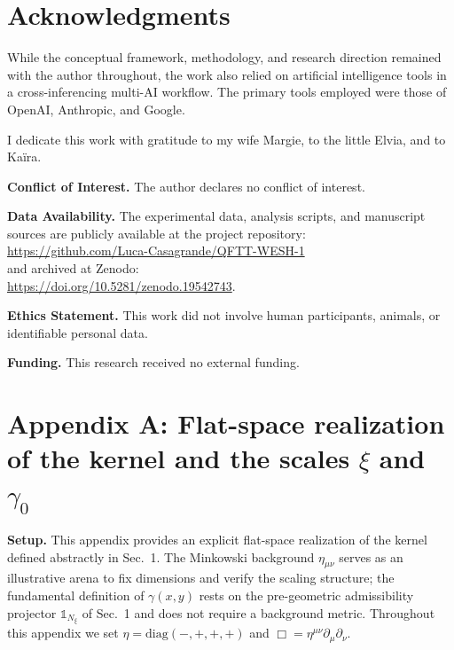 \documentclass[12pt,a4paper]{article}
\numberwithin{equation}{section}
\begin{document}
\section*{Acknowledgments}

\noindent While the conceptual framework, methodology, and research direction remained with the author throughout, the work also relied on artificial intelligence tools in a cross-inferencing multi-AI workflow. The primary tools employed were those of OpenAI, Anthropic, and Google. 

\vspace{0.3cm}
\noindent I dedicate this work with gratitude to my wife Margie, to the little Elvia, and to Ka\"ira.

\vspace{0.3cm}
\noindent\textbf{Conflict of Interest.} The author declares no conflict of interest.

\noindent\textbf{Data Availability.} The experimental data, analysis scripts, and manuscript sources are publicly available at the project repository:\\
\url{https://github.com/Luca-Casagrande/QFTT-WESH-1}\\
and archived at Zenodo:\\
\url{https://doi.org/10.5281/zenodo.19542743}.

\noindent\textbf{Ethics Statement.} This work did not involve human participants, animals, or identifiable personal data.

\noindent\textbf{Funding.} This research received no external funding.

\vspace{0.8cm}

\section*{Appendix A: Flat-space realization of the kernel and the scales \texorpdfstring{$\xi$}{ξ} and \texorpdfstring{$\gamma_0$}{γ0}}

\begingroup
\setcounter{equation}{0}
\renewcommand{\theequation}{A.\arabic{equation}}
\renewcommand{\theHequation}{A.\arabic{equation}}

\noindent\textbf{Setup.}
This appendix provides an explicit flat-space realization of the kernel defined abstractly in Sec.~1. The Minkowski background $\eta_{\mu\nu}$ serves as an illustrative arena to fix dimensions and verify the scaling structure; the fundamental definition of $\gamma(x,y)$ rests on the pre-geometric admissibility projector $\mathbb{1}_{N_\xi}$ of Sec.~1 and does not require a background metric. Throughout this appendix we set \(\eta=\mathrm{diag}(-,+,+,+)\) and \(\Box=\eta^{\mu\nu}\partial_\mu\partial_\nu\).
\end{document}
